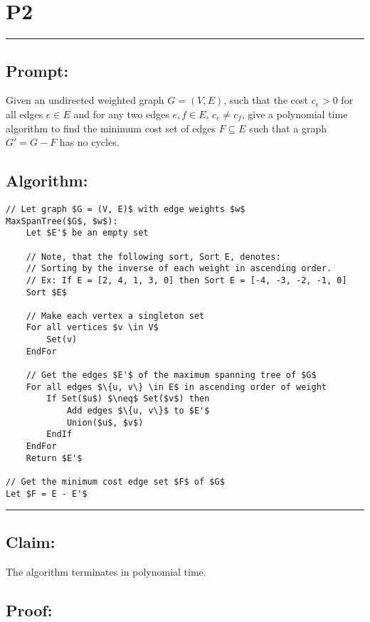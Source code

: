 \documentclass[11pt]{article}
\title{}
\author{}
\date{}
\begin{document}
\section*{P2}

\noindent\textcolor[RGB]{220,220,220}{\rule{\linewidth}{0.8pt}}

\subsection*{Prompt:} 

Given an undirected weighted graph $G = (V, E)$, such that the cost $c_e > 0$ for all edges $e \in E$ and for any two edges $e, f \in E$, $c_e \neq c_f$, give a polynomial time algorithm to find the minimum cost set of edges $F \subseteq E$ such that a graph $G' = G - F$ has no cycles.

\subsection*{Algorithm:} 

\begin{lstlisting}[basicstyle=\small, mathescape=true]
// Let graph $G = (V, E)$ with edge weights $w$
MaxSpanTree($G$, $w$):
	Let $E'$ be an empty set
	
	// Note, that the following sort, Sort E, denotes:
	// Sorting by the inverse of each weight in ascending order.
	// Ex: If E = [2, 4, 1, 3, 0] then Sort E = [-4, -3, -2, -1, 0]
	Sort $E$ 

	// Make each vertex a singleton set
	For all vertices $v \in V$
		Set(v)
	EndFor
	
	// Get the edges $E'$ of the maximum spanning tree of $G$
	For all edges $\{u, v\} \in E$ in ascending order of weight
		If Set($u$) $\neq$ Set($v$) then
			Add edges $\{u, v\}$ to $E'$
			Union($u$, $v$)	
		EndIf
	EndFor
	Return $E'$

// Get the minimum cost edge set $F$ of $G$
Let $F = E - E'$
\end{lstlisting}	

\noindent\textcolor[RGB]{220,220,220}{\rule{\linewidth}{0.8pt}}
\linebreak

\subsection*{Claim:}

The algorithm terminates in polynomial time.

\subsection*{Proof:}
\end{document}
